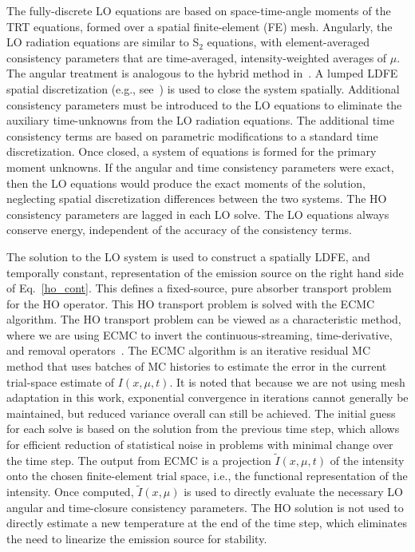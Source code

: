 \documentclass{anstrans}
\begin{document}
The fully-discrete LO equations are based on space-time-angle moments of the TRT equations, formed
over a spatial finite-element (FE) mesh.  Angularly, the LO radiation equations are similar to S$_2$
equations,  with element-averaged consistency parameters that are time-averaged, intensity-weighted averages of $\mu$.  The
angular treatment is analogous to the hybrid method in~\cite{wolters}. A lumped LDFE spatial discretization (e.g., see~\cite{morel_ldtrt}) is used to close the system
spatially. Additional consistency parameters must be introduced to the LO equations to eliminate the
auxiliary time-unknowns from the LO radiation equations.  The additional time consistency terms are
based on parametric modifications to a standard time discretization.  Once closed, a system of
equations is formed for the primary moment unknowns. If the angular and time consistency parameters
were exact, then the LO equations would produce the exact moments of the solution, neglecting
spatial discretization differences between the two systems.  The HO consistency parameters are
lagged in each LO solve. The LO equations always conserve energy, independent of the accuracy of the consistency terms.

The solution to the LO system is used to construct a spatially LDFE, and temporally constant,
representation of the emission source on the right hand side of Eq.~\eqref{ho_cont}.  This defines a
fixed-source, pure absorber transport problem for the HO operator.  This HO transport problem is
solved with the ECMC algorithm. The HO transport problem can be viewed as a characteristic
method, where we are using ECMC to invert the continuous-streaming, time-derivative, and removal
operators~\cite{bolding_nse}. The ECMC
algorithm is an iterative residual MC method that uses
batches of MC histories to estimate the error in the current trial-space estimate of 
$I(x,\mu,t)$.  It is noted that because we are not using
mesh adaptation in this work, exponential convergence in iterations cannot generally be maintained,
but reduced variance overall can still be achieved. The initial guess for each solve is based on the
solution from the previous time step, which allows for efficient reduction of statistical noise in
problems with minimal change over the time step. The output from ECMC is a projection $\tilde I(x,\mu,t)$ of the intensity onto
the chosen finite-element trial space, i.e., the functional representation of the intensity. Once
computed, $\tilde{I}(x,\mu)$ is used to directly evaluate the necessary LO angular and time-closure
consistency parameters.   The HO solution is not used to directly estimate a new temperature at the
end of the time step, which eliminates the need to linearize the emission source for stability.
\end{document}
